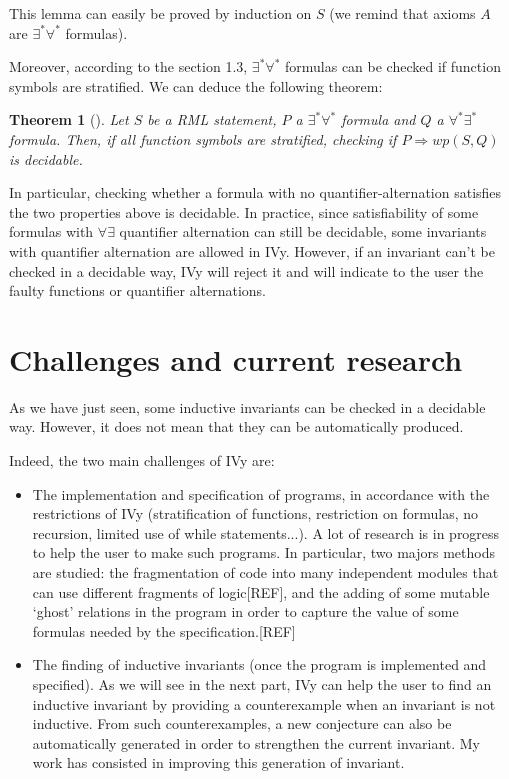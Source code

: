 \documentclass[11pt,a4paper,oldfontcommands,openany]{memoir}
\newtheorem*{theorem}{Theorem}
\begin{document}
    This lemma can easily be proved by induction on \(S\) (we remind that axioms \(A\) are \(\exists^*\forall^*\) formulas).
    
    Moreover, according to the section 1.3, \(\exists^*\forall^*\) formulas can be checked if function symbols are stratified.
    We can deduce the following theorem:

    \begin{theorem}[]
        Let \(S\) be a RML statement, \(P\) a \(\exists^*\forall^*\) formula and \(Q\) a \(\forall^*\exists^*\) formula.
        Then, if all function symbols are stratified, checking if \( P \Rightarrow wp(S,Q) \) is decidable.
    \end{theorem}

    In particular, checking whether a formula with no quantifier-alternation satisfies the two properties above is decidable.
    In practice, since satisfiability of some formulas with \( \forall\exists \) quantifier alternation can still be decidable,
    some invariants with quantifier alternation are allowed in IVy. However, if an invariant can't be checked in a decidable way, IVy will reject it
    and will indicate to the user the faulty functions or quantifier alternations.

    \section{Challenges and current research}

    As we have just seen, some inductive invariants can be checked in a decidable way.
    However, it does not mean that they can be automatically produced.

    Indeed, the two main challenges of IVy are:
    \begin{itemize}
        \item The implementation and specification of programs, in accordance with the restrictions of IVy
        (stratification of functions, restriction on formulas, no recursion, limited use of while statements...).
        A lot of research is in progress to help the user to make such programs. In particular, two majors methods are
        studied: the fragmentation of code into many independent modules that can use different fragments of logic[REF],
        and the adding of some mutable `ghost' relations in the program in order to capture the value of some formulas needed by the specification.[REF]
        
        \item The finding of inductive invariants (once the program is implemented and specified). As we will see in the next part,
        IVy can help the user to find an inductive invariant by providing a counterexample when an invariant is not inductive.
        From such counterexamples, a new conjecture can also be automatically generated in order to strengthen the current invariant.
        My work has consisted in improving this generation of invariant.
    \end{itemize}
\end{document}
